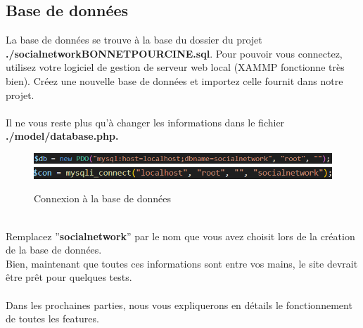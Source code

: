 \documentclass{article}
\begin{document}
\subsection{Base de données}
La base de données se trouve à la base du dossier du projet \textbf{./socialnetworkBONNETPOURCINE.sql}. Pour pouvoir vous connectez, utilisez votre logiciel de gestion de serveur web local
(XAMMP fonctionne très bien). Créez une nouvelle base de données et importez celle fournit dans
notre projet.\\\\
Il ne vous reste plus qu’à changer les informations dans le fichier \textbf{./model/database.php.}
\begin{figure}[h]\centering
\includegraphics[width=\textwidth]{database1}	
\includegraphics[width=\textwidth]{database2}
\caption{Connexion à la base de données}
\end{figure}\\
Remplacez ”\textbf{socialnetwork}” par le nom que vous avez choisit lors de la création de la base de
données.\\
Bien, maintenant que toutes ces informations sont entre vos mains, le site devrait être prêt pour
quelques tests.\\\\
Dans les prochaines parties, nous vous expliquerons en détails le fonctionnement de toutes les features.
\end{document}
